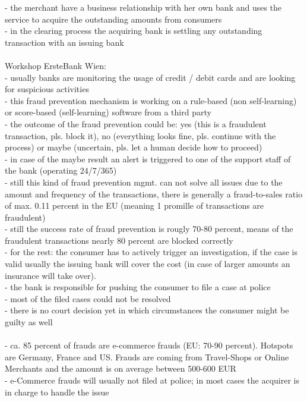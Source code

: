 - the merchant have a business relationship with her own bank and uses the service to acquire the outstanding amounts from consumers \\
- in the clearing process the acquiring bank is settling any outstanding transaction with an issuing bank \\
\\
Workshop ErsteBank Wien: \\
- usually banks are monitoring the usage of credit / debit cards and are looking for suspicious activities \\
- this fraud prevention mechanism is working on a rule-based (non self-learning) or score-based (self-learning) software from a third party \\
- the outcome of the fraud prevention could be: yes (this is a fraudulent transaction, pls. block it), no (everything looks fine, pls. continue with the process) or maybe (uncertain, pls. let a human decide how to proceed) \\
- in case of the maybe result an alert is triggered to one of the support staff of the bank (operating 24/7/365) \\
- still this kind of fraud prevention mgmt. can not solve all issues due to the amount and frequency of the transactions, there is generally a
fraud-to-sales ratio of max. 0.11 percent in the EU (meaning 1 promille of transactions are fraudulent) \\
- still the success rate of fraud prevention is rougly 70-80 percent, means of the fraudulent transactions nearly 80 percent are blocked correctly \\
- for the rest: the consumer has to actively trigger an investigation, if the case is valid usually the issuing bank will cover the cost (in case of larger amounts an insurance will take over). \\
- the bank is responsible for pushing the consumer to file a case at police \\
- most of the filed cases could not be resolved \\
- there is no court decision yet in which circumstances the consumer might be guilty as well \\
\\
- ca. 85 percent of frauds are e-commerce frauds (EU: 70-90 percent). Hotspots are Germany, France and US. Frauds are coming from Travel-Shops or Online Merchants and the amount is on average between 500-600 EUR \\
- e-Commerce frauds will usually not filed at police; in most cases the acquirer is in charge to handle the issue \\
